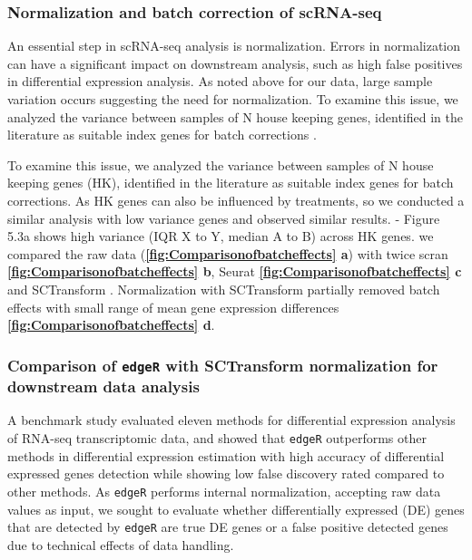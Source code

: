 \subsubsection{Normalization and batch correction of scRNA-seq}
 An essential step in scRNA-seq analysis is normalization. Errors in normalization can have a significant impact on downstream analysis, such as high false positives in differential expression analysis.
 As noted above for our data, large sample variation occurs suggesting the need for normalization. To examine this issue, we analyzed the variance between samples of N house keeping genes, identified in the literature as suitable index genes for batch corrections \cite{lin2019evaluating}.

 To examine this issue, we analyzed the variance between samples of N house keeping genes (HK), identified in the literature as suitable index genes for batch corrections. 
As HK genes can also be influenced by treatments, so we conducted a similar analysis with low variance genes and observed similar results.
- Figure 5.3a shows high variance (IQR X to Y, median A to B) across HK genes.
we compared the raw data (\textbf{\autoref{fig:Comparisonofbatcheffects} a}) with twice scran \cite{lun2016pooling} \textbf{\autoref{fig:Comparisonofbatcheffects} b}, Seurat \cite{butler2018integrating} \textbf{\autoref{fig:Comparisonofbatcheffects} c} and SCTransform \cite{hafemeister2019normalization}. Normalization with SCTransform partially removed batch effects with small range of mean gene expression differences \textbf{\autoref{fig:Comparisonofbatcheffects} d}.

\subsubsection{Comparison of \texttt{edgeR} with SCTransform normalization for downstream data analysis}
A benchmark study evaluated eleven methods \cite{soneson2013comparison} for differential expression analysis of RNA-seq transcriptomic data, and showed that \texttt{edgeR} outperforms other methods in differential expression estimation with high accuracy of differential expressed genes detection while showing low false discovery rated compared to other methods. 
As \texttt{edgeR} performs internal normalization, accepting raw data values as input, we sought to evaluate whether differentially expressed (DE) genes that are detected by \texttt{edgeR} are true DE genes or a false positive detected genes due to technical effects of data handling.


